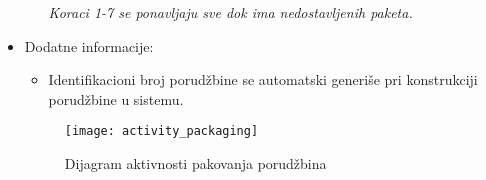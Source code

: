 \begin{itemize}
\begin{enumerate}
			\textit{Koraci 1-7 se ponavljaju sve dok ima nedostavljenih paketa.}
		\end{enumerate}
		\item{Dodatne informacije:}
		\begin{itemize}
			\item{Identifikacioni broj porudžbine se automatski generiše pri konstrukciji porudžbine u sistemu.}
		\end{itemize}
	\begin{figure}[H]
		\begin{center}
			\texttt{[image: activity\_packaging]}
			\caption{Dijagram aktivnosti pakovanja porudžbina}		
		\end{center}
	\end{figure}
	\end{itemize}
